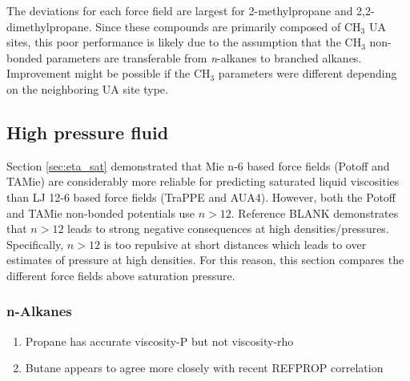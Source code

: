 \documentclass[preprint,review,12pt]{elsarticle}
\begin{document}
	
	The deviations for each force field are largest for 2-methylpropane and 2,2-dimethylpropane. Since these compounds are primarily composed of CH$_3$ UA sites, this poor performance is likely due to the assumption that the CH$_3$ non-bonded parameters are transferable from \textit{n}-alkanes to branched alkanes. Improvement might be possible if the CH$_3$ parameters were different depending on the neighboring UA site type.
	
	\subsection{High pressure fluid} \label{sec:T293highP}
	
	Section \ref{sec:eta_sat} demonstrated that Mie n-6 based force fields (Potoff and TAMie) are considerably more reliable for predicting saturated liquid viscosities than LJ 12-6 based force fields (TraPPE and AUA4). However, both the Potoff and TAMie non-bonded potentials use $n > 12$. Reference BLANK demonstrates that $n > 12$ leads to strong negative consequences at high densities/pressures. Specifically, $n > 12$ is too repulsive at short distances which leads to over estimates of pressure at high densities. For this reason, this section compares the different force fields above saturation pressure.
	
	\subsubsection{n-Alkanes}
	
	\begin{enumerate}
		\item Propane has accurate viscosity-P but not viscosity-rho
		\item Butane appears to agree more closely with recent REFPROP correlation
	\end{enumerate}
	
	
\end{document}

